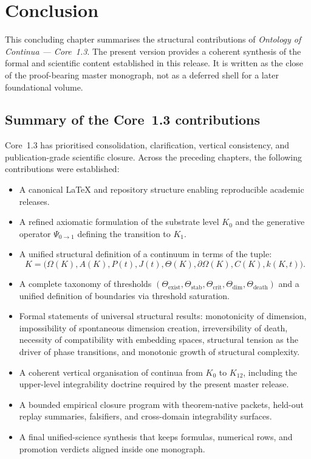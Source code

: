 
\section{Conclusion}
\label{sec:conclusion}

This concluding chapter summarises the structural contributions of
\emph{Ontology of Continua --- Core~1.3}. The present version provides a
coherent synthesis of the formal and scientific content established in this
release. It is written as the close of the proof-bearing master monograph,
not as a deferred shell for a later foundational volume.

\subsection{Summary of the Core~1.3 contributions}

Core~1.3 has prioritised consolidation, clarification, vertical consistency,
and publication-grade scientific closure.
Across the preceding chapters, the following contributions were established:

\begin{itemize}
    \item A canonical \LaTeX{} and repository structure enabling reproducible academic releases.
    \item A refined axiomatic formulation of the substrate level \(K_0\) and the generative operator 
          \(\Psi_{0\to 1}\) defining the transition to \(K_1\).
    \item A unified structural definition of a continuum in terms of the tuple:
          \[
              K = \big(\Omega(K), A(K), P(t), J(t), \Theta(K), \partial\Omega(K), C(K), k(K,t)\big).
          \]
    \item A complete taxonomy of thresholds 
          \((\Theta_{\mathrm{exist}}, \Theta_{\mathrm{stab}}, \Theta_{\mathrm{crit}}, 
            \Theta_{\mathrm{dim}}, \Theta_{\mathrm{death}})\) 
          and a unified definition of boundaries via threshold saturation.
    \item Formal statements of universal structural results:
          monotonicity of dimension,
          impossibility of spontaneous dimension creation,
          irreversibility of death,
          necessity of compatibility with embedding spaces,
          structural tension as the driver of phase transitions,
          and monotonic growth of structural complexity.
    \item A coherent vertical organisation of continua from \(K_0\) to \(K_{12}\),  
          including the upper-level integrability doctrine required by the present master release.
    \item A bounded empirical closure program with theorem-native packets, held-out replay summaries, falsifiers, and cross-domain integrability surfaces.
    \item A final unified-science synthesis that keeps formulas, numerical rows, and promotion verdicts aligned inside one monograph.
\end{itemize}

